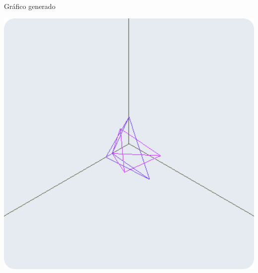 \documentclass[a4paper]{article}
\begin{document}
Gráfico generado 
\begin{center}
\includegraphics[width=14cm]{./src/4.png}
\end{center}
\newpage
\end{document}
